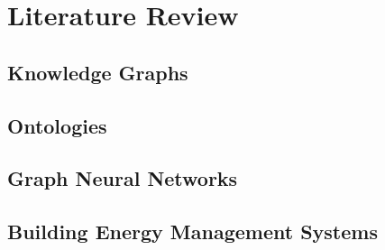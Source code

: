 \chapter{Literature Review}\label{chap:literature-review}

\section{Knowledge Graphs}\label{sec:knowledge-graphs}



\section{Ontologies}\label{sec:ontologies}

\section{Graph Neural Networks}\label{sec:graph-neural-networks}

\section{Building Energy Management Systems}\label{sec:building-energy-management-systems}

